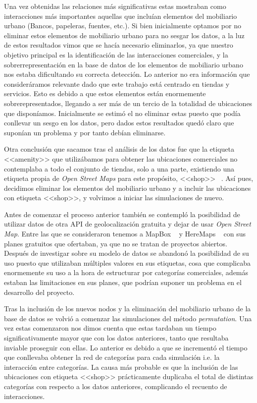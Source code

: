 Una vez obtenidas las relaciones más significativas estas mostraban como interacciones más importantes aquellas que incluían elementos del mobiliario urbano (Bancos, papeleras, fuentes, etc.). Si bien inicialmente optamos por no eliminar estos elementos de mobiliario urbano para no sesgar los datos, a la luz de estos resultados vimos que se hacía necesario eliminarlos, ya que nuestro objetivo principal es la identificación de las interacciones comerciales, y la sobrerrepresentación en la base de datos de los elementos de mobiliario urbano nos estaba dificultando su correcta detección. Lo anterior no era información que consideráramos relevante dado que este trabajo está centrado en tiendas y servicios. Esto es debido a que estos elementos están enormemente sobrerepresentados, llegando a ser más de un tercio de la totalidad de ubicaciones que disponíamos. Inicialmente se estimó el no eliminar estas puesto que podía conllevar un sesgo en los datos, pero dados estos resultados quedó claro que suponían un problema y por tanto debían eliminarse.

Otra conclusión que sacamos tras el análisis de los datos fue que la etiqueta <<amenity>> que utilizábamos para obtener las ubicaciones comerciales no contemplaba
a todo el conjunto de tiendas, solo a una parte, existiendo una etiqueta propia de \textit{Open Street Maps} para este propósito, <<shop>> ~\cite{OSMshop}. Así pues, decidimos eliminar los elementos del mobiliario urbano y a incluir las ubicaciones con etiqueta <<shop>>, y volvimos a iniciar las simulaciones de nuevo.

Antes de comenzar el proceso anterior también se contempló la posibilidad de utilizar datos de otra API de geolocalización gratuita y dejar de usar \textit{Open Street Map}. Entre las que se consideraron tenemos a MapBox ~\cite{mapboxMapsGeocoding} y HereMaps ~\cite{hereHEREWeGo} con sus planes gratuitos que ofertaban, ya que no se tratan de proyectos abiertos. Después de investigar sobre su modelo de datos se abandonó la posibilidad de su uso puesto que utilizaban múltiples valores en sus etiquetas, cosa que complicaba enormemente su uso a la hora de estructurar por categorías comerciales, además estaban las limitaciones en sus planes, que podrían suponer un problema en el desarrollo del proyecto.

Tras la inclusión de los nuevos nodos y la eliminación del mobiliario urbano de la base de datos se volvió a comenzar las simulaciones del método \textit{permutation}.
Una vez estas comenzaron nos dimos cuenta que estas tardaban un tiempo significativamente mayor que con los datos anteriores, tanto que resultaba inviable proseguir con ellas. Lo anterior es debido a que se incrementó el tiempo que conllevaba obtener la red de categorías para cada simulación i.e. la interacción entre categorías. La causa más probable es que la inclusión de las ubicaciones con etiqueta <<shop>> prácticamente duplicaba el total de distintas categorías con respecto a los datos anteriores, complicando el recuento de interacciones.

